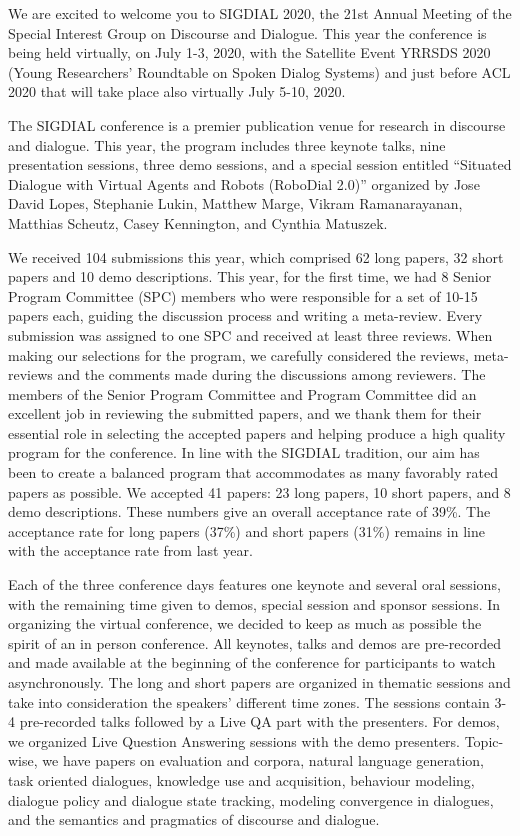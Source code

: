 We are excited to welcome you to SIGDIAL 2020, the 21st Annual Meeting of the Special Interest Group on Discourse and Dialogue. This year the conference is being held virtually, on July 1-3, 2020, with the Satellite Event YRRSDS 2020 (Young Researchers' Roundtable on Spoken Dialog Systems) and just before ACL 2020 that will take place also virtually July 5-10, 2020.  

The SIGDIAL conference is a premier publication venue for research in discourse and dialogue. This year, the program includes three keynote talks, nine presentation sessions, three demo sessions, and a special session entitled ``Situated Dialogue with Virtual Agents and Robots (RoboDial 2.0)'' organized by Jose David Lopes, Stephanie Lukin, Matthew Marge, Vikram Ramanarayanan,  Matthias Scheutz, Casey Kennington, and Cynthia Matuszek.

We received 104 submissions this year, which comprised 62 long papers, 32 short papers and 10 demo descriptions. This year, for the first time, we had 8 Senior Program Committee (SPC) members who were responsible for a set of 10-15 papers each, guiding the discussion process and writing a meta-review. Every submission was assigned to one SPC and received at least three reviews. When making our selections for the program, we carefully considered the reviews, meta-reviews and the comments made during the discussions among reviewers. The members of the Senior Program Committee and Program Committee did an excellent job in reviewing the submitted papers, and we thank them for their essential role in selecting the accepted papers and helping produce a high quality program for the conference. In line with the SIGDIAL tradition, our aim has been to create a balanced program that accommodates as many favorably rated papers as possible. We accepted 41 papers: 23 long papers, 10 short papers, and 8 demo descriptions. These numbers give an overall acceptance rate of 39\%. The acceptance rate for long papers (37\%) and short papers (31\%) remains in line with the acceptance rate from last year.

Each of the three conference days features one keynote and several oral sessions, with the remaining time given to demos, special session and sponsor sessions. In organizing the virtual conference, we decided to keep as much as possible the spirit of an in person conference. All keynotes, talks and demos are pre-recorded and made available at the beginning of the conference for participants to watch asynchronously. The long and short papers are organized in thematic sessions and take into consideration the speakers' different time zones.  The sessions contain 3-4 pre-recorded talks followed by a Live QA part with the presenters. For demos, we organized Live Question Answering sessions with the demo presenters. Topic-wise, we have papers on evaluation and corpora, natural language generation, task oriented dialogues, knowledge use and acquisition,  behaviour modeling, dialogue policy and dialogue state tracking, modeling convergence in dialogues, and the semantics and pragmatics of discourse and dialogue. 

